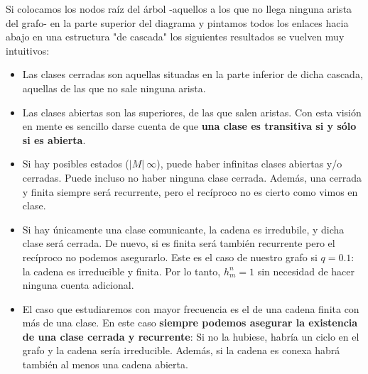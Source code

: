 \documentclass[11pt]{article}
\theoremstyle{plain}
\begin{document}
Si colocamos los nodos raíz del árbol -aquellos a los que no llega ninguna arista del grafo- en la parte superior del diagrama y pintamos todos los enlaces hacia abajo en una estructura "de cascada" los siguientes resultados se vuelven muy intuitivos:

\begin{itemize}
	\item Las clases cerradas son aquellas situadas en la parte inferior de dicha cascada, aquellas de las que no sale ninguna arista.
	\item Las clases abiertas son las superiores, de las que salen aristas. Con esta visión en mente es sencillo darse cuenta de que \textbf{una clase es transitiva si y sólo si es abierta}.
	\item Si hay posibles estados ($|M| \ \infty$), puede haber infinitas clases abiertas y/o cerradas. Puede incluso no haber ninguna clase cerrada. Además, una cerrada y finita siempre será recurrente, pero el recíproco no es cierto como vimos en clase.
	\item Si hay únicamente una clase comunicante, la cadena es irredubile, y dicha clase será cerrada. De nuevo, si es finita será también recurrente pero el recíproco no podemos asegurarlo. Este es el caso de nuestro grafo si $q=0.1$: la cadena es irreducible y finita. Por lo tanto, $h_m^n = 1$ sin necesidad de hacer ninguna cuenta adicional.
	\item El caso que estudiaremos con mayor frecuencia es el de una cadena finita con más de una clase. En este caso \textbf{siempre podemos asegurar la existencia de una clase cerrada y recurrente}: Si no la hubiese, habría un ciclo en el grafo y la cadena sería irreducible. Además, si la cadena es conexa habrá también al menos una cadena abierta.
\end{itemize}
\end{document}
